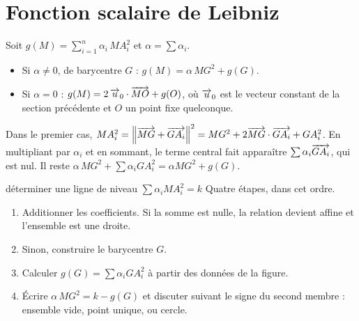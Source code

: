 \section{Fonction scalaire de Leibniz}

\begin{theoreme}
Soit $g(M) = \displaystyle\sum_{i=1}^{n}\alpha_{i}\,MA_{i}^{2}$ et
$\alpha = \sum \alpha_{i}$.
\begin{itemize}[leftmargin=*, itemsep=0.1em]
  \item Si $\alpha \neq 0$, de barycentre $G$ :
        $g(M) = \alpha\,MG^{2}+g(G)$.
  \item Si $\alpha = 0$ : $g(M) = 2\,\overrightarrow{u}_{0} \cdot \overrightarrow{MO}+g(O)$, où
        $\overrightarrow{u}_{0}$ est le vecteur constant de la section précédente et $O$ un
        point fixe quelconque.
\end{itemize}
\end{theoreme}

\begin{demonstration}
Dans le premier cas,
$MA_{i}^{2} = \left\lVert \overrightarrow{MG}+\overrightarrow{GA_{i}} \right\rVert^{2}
= MG^{2}+2\overrightarrow{MG} \cdot \overrightarrow{GA_{i}}+GA_{i}^{2}$. En multipliant par
$\alpha_{i}$ et en sommant, le terme central fait apparaître
$\sum \alpha_{i}\overrightarrow{GA_{i}}$, qui est nul. Il reste
$\alpha\,MG^{2}+\sum \alpha_{i}GA_{i}^{2} = \alpha MG^{2}+g(G)$.
\end{demonstration}

\begin{methode}{déterminer une ligne de niveau $\sum \alpha_{i}MA_{i}^{2} = k$}
Quatre étapes, dans cet ordre.
\begin{enumerate}[label=\textbf{\arabic*.}, leftmargin=*, itemsep=0.15em]
  \item Additionner les coefficients. Si la somme est nulle, la relation
        devient affine et l'ensemble est une droite.
  \item Sinon, construire le barycentre $G$.
  \item Calculer $g(G) = \sum \alpha_{i}GA_{i}^{2}$ à partir des données de la
        figure.
  \item Écrire $\alpha\,MG^{2} = k-g(G)$ et discuter suivant le signe du
        second membre : ensemble vide, point unique, ou cercle.
\end{enumerate}
\end{methode}

